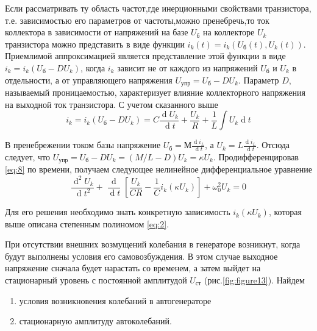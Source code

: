 Если рассматривать ту область частот,где инерционными свойствами транзистора, т.е. зависимостью его параметров от частоты,можно пренебречь,то ток коллектора в зависимости от напряжений на базе $U_\text{б}$ на коллекторе $U_k$ транзистора можно представить в виде функции $i_k(t)=i_k(U_\text{б}(t),U_k(t))$. Приемлимой аппроксимацией является представление этой функции в виде $i_k=i_k(U_\text{б}-DU_k)$, когда $i_k$ зависит не от каждого из напряжений $U_\text{б}$ и $U_k$ в отдельности, а от управляющего напряжения $U_\text{упр}=U_\text{б}-DU_k$. Параметр $D$, называемый проницаемостью, характеризует влияние коллекторного напряжения на выходной ток транзистора. С учетом сказанного выше
\begin{equation}
i_k=i_k(U_\text{б}-DU_k)=C\frac{\operatorname dU_k}{\operatorname dt}+\frac{U_k}{R}+\frac{1}{L}\int U_k \operatorname dt
\label{eq:8}
\end{equation}{}

В пренебрежении током базы напряжение $\displaystyle U_\text{б}=М\frac{\operatorname di_L}{\operatorname dt}$, а $\displaystyle U_k=L\frac{\operatorname di_L}{\operatorname dt}$. Отсюда следует, что $U_\text{упр}=U_\text{б}-DU_k=(M/L-D)U_k=\kappa U_k$. Продифференцировав \eqref{eq:8} по времени, получаем следующее нелинейное дифференциальное уравнение
\begin{equation}
\frac{\operatorname d^2U_k}{\operatorname dt^2}+\frac{\operatorname d}{\operatorname dt}[\frac{U_k}{CR}-\frac{1}{C}i_k(\kappa U_k)]+\omega_0^2U_k=0
\label{eq:9}
\end{equation}

Для его решения необходимо знать конкретную зависимость $i_k(\kappa U_k)$, которая выше описана степенным полиномом \eqref{eq:2}. 

При отсутствии внешних возмущений колебания в генераторе возникнут, когда будут выполнены условия его самовозбуждения. В этом случае выходное напряжение сначала будет нарастать со временем, а
затем выйдет на стационарный уровень с постоянной амплитудой $U_\text{ст}$ (рис.\ref{fig:figure13}). Найдем
\begin{enumerate}
\item условия возникновения колебаний в автогенераторе
\item стационарную амплитуду автоколебаний.
\end{enumerate}

